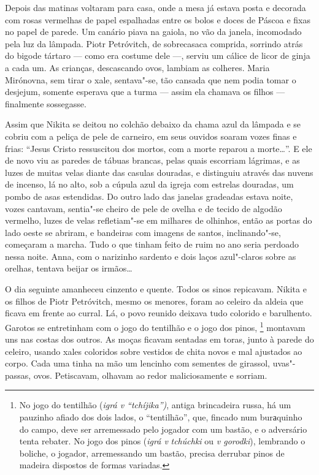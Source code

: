 Depois das matinas voltaram para casa, onde a mesa já estava posta e
decorada com rosas vermelhas de papel espalhadas entre os bolos e doces
de Páscoa e fixas no papel de parede. Um canário piava na gaiola, no vão
da janela, incomodado pela luz da lâmpada. Piotr Petróvitch, de
sobrecasaca comprida, sorrindo atrás do bigode tártaro --- como era
costume dele ---, serviu um cálice de licor de ginja a cada um. As
crianças, descascando ovos, lambiam as colheres. Maria Mirónovna, sem
tirar o xale, sentava"-se, tão cansada que nem podia tomar o desjejum,
somente esperava que a turma --- assim ela chamava os filhos ---
finalmente sossegasse.

Assim que Nikita se deitou no colchão debaixo da chama azul da lâmpada e
se cobriu com a peliça de pele de carneiro, em seus ouvidos soaram vozes
finas e frias: ``Jesus Cristo ressuscitou dos mortos, com a morte
reparou a morte\ldots{}''. E ele de novo viu as paredes de tábuas
brancas, pelas quais escorriam lágrimas, e as luzes de muitas velas
diante das casulas douradas, e distinguiu através das nuvens de incenso,
lá no alto, sob a cúpula azul da igreja com estrelas douradas, um pombo
de asas estendidas. Do outro lado das janelas gradeadas estava noite,
vozes cantavam, sentia"-se cheiro de pele de ovelha e de tecido de
algodão vermelho, luzes de velas refletiam"-se em milhares de olhinhos,
então as portas do lado oeste se abriram, e bandeiras com imagens de
santos, inclinando"-se, começaram a marcha. Tudo o que tinham feito de
ruim no ano seria perdoado nessa noite. Anna, com o narizinho sardento e
dois laços azul"-claros sobre as orelhas, tentava beijar os irmãos\ldots{}

O dia seguinte amanheceu cinzento e quente. Todos os sinos repicavam.
Nikita e os filhos de Piotr Petróvitch, mesmo os menores, foram ao
celeiro da aldeia que ficava em frente ao curral. Lá, o povo reunido
deixava tudo colorido e barulhento. Garotos se entretinham com o jogo do
tentilhão e o jogo dos pinos, \footnote{No jogo do tentilhão (\emph{igrá
  v ``tchíjika'')}, antiga brincadeira russa, há um pauzinho afiado dos
  dois lados, o ``tentilhão'', que, fincado num burаquinho do campo,
  deve ser arremessado pelo jogador com um bastão, e o adversário tenta
  rebater. No jogo dos pinos (\emph{igrá v} \emph{tchúchki} ou \emph{v
  gorodki}), lembrando o boliche, o jogador, arremessando um bastão,
  precisa derrubar pinos de madeira dispostos de formas variadas.}
montavam uns nas costas dos outros. As moças ficavam sentadas em toras,
junto à parede do celeiro, usando xales coloridos sobre vestidos de
chita novos e mal ajustados ao corpo. Cada uma tinha na mão um lencinho
com sementes de girassol, uvas"-passas, ovos. Petiscavam, olhavam ao
redor maliciosamente e sorriam.

